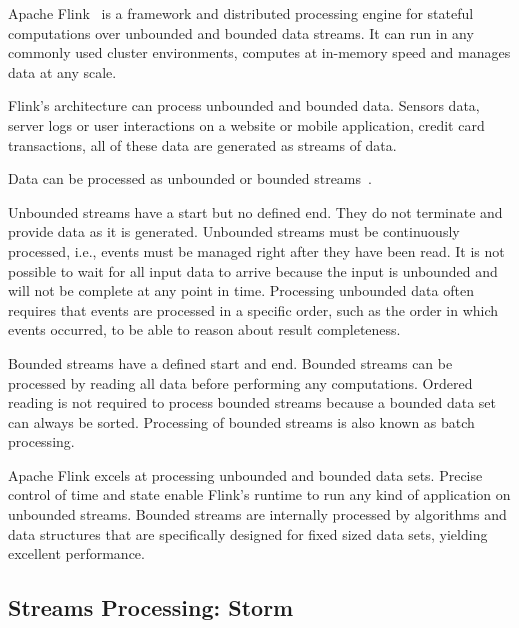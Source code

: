 Apache Flink~\cite{misc:ApacheFlink} is a framework and distributed processing engine for stateful computations over unbounded and bounded data streams. It can run in any commonly used cluster environments, computes at in-memory speed and manages data at any scale.

Flink’s architecture can process unbounded and bounded data. Sensors data, server logs or user interactions on a website or mobile application, credit card transactions, all of these data are generated as streams of data.

Data can be processed as unbounded or bounded streams~\cite{misc:ApacheFlinkArchitecture}. 

Unbounded streams have a start but no defined end. They do not terminate and provide data as it is generated. Unbounded streams must be continuously processed, i.e., events must be managed  right after they have been read. It is not possible to wait for all input data to arrive because the input is unbounded and will not be complete at any point in time. Processing unbounded data often requires that events are processed in a specific order, such as the order in which events occurred, to be able to reason about result completeness.

Bounded streams have a defined start and end. Bounded streams can be processed by reading all data before performing any computations. Ordered reading is not required to process bounded streams because a bounded data set can always be sorted. Processing of bounded streams is also known as batch processing.


Apache Flink excels at processing unbounded and bounded data sets. Precise control of time and state enable Flink’s runtime to run any kind of application on unbounded streams. Bounded streams are internally processed by algorithms and data structures that are specifically designed for fixed sized data sets, yielding excellent performance.

\subsection{Streams Processing: Storm}\label{sec:storm}

